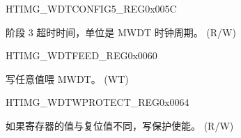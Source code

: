 \begin{register}{H}{TIMG\_WDTCONFIG5\_REG}{0x005C}\label{regdesc:TIMGWDTCONFIG5REG}
%
\regnewline%
\begin{regdesc}\begin{reglist}
\label{fielddesc:TIMGWDTSTG3HOLD}\item [TIMG\_WDT\_STG3\_HOLD] 阶段 3 超时时间，单位是 MWDT 时钟周期。 (R/W)
\end{reglist}\end{regdesc}
\end{register}


\begin{register}{H}{TIMG\_WDTFEED\_REG}{0x0060}\label{regdesc:TIMGWDTFEEDREG}
%
\regnewline%
\begin{regdesc}\begin{reglist}
\label{fielddesc:TIMGWDTFEED}\item [TIMG\_WDT\_FEED] 写任意值喂 MWDT。 (WT)
\end{reglist}\end{regdesc}
\end{register}


\begin{register}{H}{TIMG\_WDTWPROTECT\_REG}{0x0064}\label{regdesc:TIMGWDTWPROTECTREG}
%
\regnewline%
\begin{regdesc}\begin{reglist}
\label{fielddesc:TIMGWDTWKEY}\item [TIMG\_WDT\_WKEY] 如果寄存器的值与复位值不同，写保护使能。 (R/W)
\end{reglist}\end{regdesc}
\end{register}


